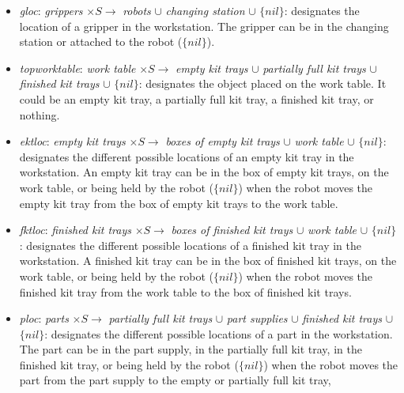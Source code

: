 \begin{itemize}
\item \textit{gloc}: \textit{grippers} $\times S \rightarrow$ \textit{robots} $\cup$ \textit{changing station} $\cup$ $\lbrace nil\rbrace$: designates the location of a gripper in the workstation. The gripper can be in the changing station or attached to the robot ($\lbrace nil\rbrace$).



\item \textit{topworktable}: \textit{work table} $\times S \rightarrow$ \textit{empty kit trays} $\cup$ \textit{partially full kit trays} $\cup$ \textit{finished kit trays} $\cup$ $\lbrace nil\rbrace$: designates the object placed on the work table. It could be an empty kit tray, a partially full kit tray, a finished kit tray, or nothing.

\item \textit{ektloc}: {\itshape {empty kit trays}} $\times S \rightarrow$ {\itshape {boxes of empty kit trays}} $\cup$ {\itshape {work table}} $\cup$ $\lbrace nil\rbrace$: designates the different possible locations of an empty kit tray in the workstation. An empty kit tray can be in the box of empty kit trays, on the work table, or being held by the robot ($\lbrace nil\rbrace$) when the robot moves the empty kit tray from the box of empty kit trays to the work table.

\item \textit{fktloc}: \textit{finished kit trays} $\times S \rightarrow$ \textit{boxes of finished kit trays} $\cup$ \textit{work table} $\cup$ $\lbrace nil\rbrace$: designates the different possible locations of a finished kit tray in the workstation. A finished kit tray can be in the box of finished kit trays, on the work table, or being held by the robot ($\lbrace nil\rbrace$) when the robot moves the finished kit tray from the work table to the box of finished kit trays.


\item \textit{ploc}: \textit{parts} $\times S \rightarrow$ \textit{partially full kit trays} $\cup$ \textit{part supplies} $\cup$ \textit{finished kit trays} $\cup$ $\lbrace nil\rbrace$: designates the different possible locations of a part in the workstation. The part can be in the part supply, in the partially full kit tray, in the finished kit tray, or being held by the robot ($\lbrace nil\rbrace$) when the robot moves the part from the part supply to the empty or partially full kit tray,


\end{itemize}
